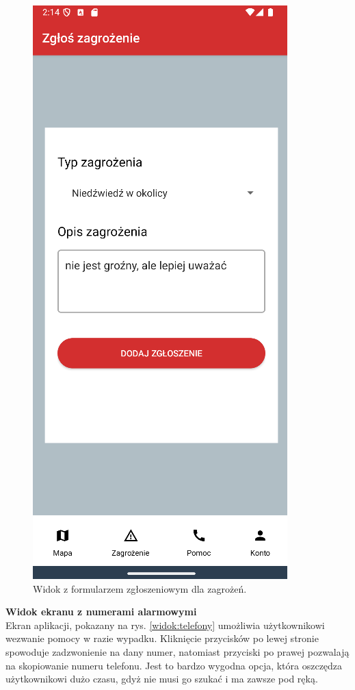 \begin{figure}[H]
    \centering
    \includegraphics[scale=0.70]{img/imp/widok-danger.png}
    \caption{Widok z formularzem zgłoszeniowym dla zagrożeń.}
    \label{widok:zgłoszenie}
\end{figure}


\textbf{Widok ekranu z numerami alarmowymi} \\
\indent Ekran aplikacji, pokazany na rys. \ref{widok:telefony} umożliwia użytkownikowi wezwanie pomocy w razie wypadku. Kliknięcie przycisków po lewej stronie spowoduje zadzwonienie na dany numer, natomiast przyciski po prawej pozwalają na skopiowanie numeru telefonu. Jest to bardzo wygodna opcja, która oszczędza użytkownikowi dużo czasu, gdyż nie musi go szukać i ma zawsze pod ręką.

